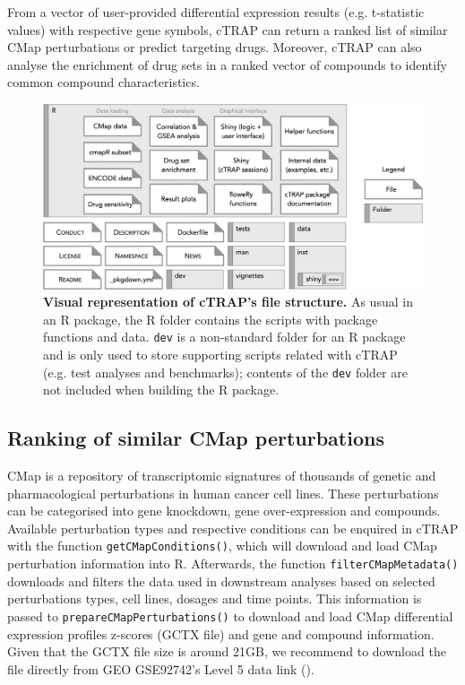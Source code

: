 From a vector of user-provided differential expression results (e.g. t-statistic values) with respective gene symbols, cTRAP can return a ranked list of similar CMap perturbations or predict targeting drugs. Moreover, cTRAP can also analyse the enrichment of drug sets in a ranked vector of compounds to identify common compound characteristics.

\begin{figure}[!h]
  \includegraphics[width=1\textwidth]{images/ctrap/file-structure}
  \centering
  \caption[cTRAP file structure]{\textbf{Visual representation of cTRAP's file structure.} As usual in an R package, the R folder contains the scripts with package functions and data. \texttt{dev} is a non-standard folder for an R package and is only used to store supporting scripts related with cTRAP (e.g. test analyses and benchmarks); contents of the \texttt{dev} folder are not included when building the R package.}
  \label{fig:ctrap-file-structure}
\end{figure}

\subsection{Ranking of similar CMap perturbations}

CMap is a repository of transcriptomic signatures of thousands of genetic and pharmacological perturbations in human cancer cell lines. These perturbations can be categorised into gene knockdown, gene over-expression and compounds. Available perturbation types and respective conditions can be enquired in cTRAP with the function \texttt{getCMapConditions()}, which will download and load CMap perturbation information into R. Afterwards, the function \texttt{filterCMapMetadata()} downloads and filters the data used in downstream analyses based on selected perturbations types, cell lines, dosages and time points. This information is passed to \texttt{prepareCMapPerturbations()} to download and load CMap differential expression profiles z-scores (GCTX file) and gene and compound information. Given that the GCTX file size is around 21GB, we recommend to download the file directly from GEO GSE92742’s Level 5 data link ().

